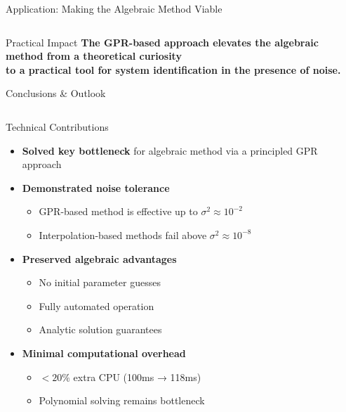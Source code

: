 \documentclass[aspectratio=169]{beamer}
\begin{document}
\begin{frame}{Application: Making the Algebraic Method Viable}
\begin{columns}[t]
  \end{columns}
  
  \vspace{0.5em}
  \begin{alertblock}{Practical Impact}
    \centering
    \footnotesize
    \textbf{The GPR-based approach elevates the algebraic method from a theoretical curiosity} \\
    \textbf{to a practical tool for system identification in the presence of noise.}
  \end{alertblock}
  
\end{frame}

\begin{frame}{Conclusions \& Outlook}
  
  \begin{columns}[T]
    
    \begin{column}{0.32\textwidth}
      \begin{block}{\small Technical Contributions}
        \tiny
        \begin{itemize}
          \item \textbf{Solved key bottleneck} for algebraic method via a principled GPR approach
          
          \item \textbf{Demonstrated noise tolerance}
          \begin{itemize}
            \tiny
            \item GPR-based method is effective up to $\sigma^2 \approx 10^{-2}$ 
            \item Interpolation-based methods fail above $\sigma^2 \approx 10^{-8}$
          \end{itemize}
          
          \item \textbf{Preserved algebraic advantages}
          \begin{itemize}
            \tiny
            \item No initial parameter guesses
            \item Fully automated operation
            \item Analytic solution guarantees
          \end{itemize}
          
          \item \textbf{Minimal computational overhead}
          \begin{itemize}
            \tiny
            \item $<20\%$ extra CPU (100ms → 118ms)
            \item Polynomial solving remains bottleneck
          \end{itemize}
          

\end{itemize}
\end{block}
\end{column}
\end{columns}
\end{frame}
\end{document}
